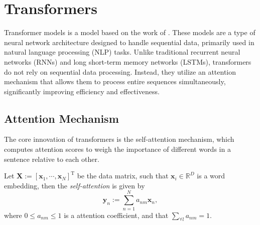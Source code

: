\section{Transformers}\label{sec:transformers}
Transformer models is a model based on the work of \cite{vaswani2017attention}. These models are a type of neural network architecture designed to handle sequential data, primarily used in natural language processing (NLP) tasks. Unlike traditional recurrent neural networks (RNNs) and long short-term memory networks (LSTMs), transformers do not rely on sequential data processing. Instead, they utilize an attention mechanism that allows them to process entire sequences simultaneously, significantly improving efficiency and effectiveness.

\subsection{Attention Mechanism}
The core innovation of transformers is the self-attention mechanism, which computes attention scores to weigh the importance of different words in a sentence relative to each other. 

\begin{defn}\label{defn:vec-self-attention}
    Let $\mathbf{X}:=[\mathbf{x}_1,\cdots,\mathbf{x}_N]^{\text{T}}$ be the data matrix, such that $\mathbf{x}_i\in\mathbb{R}^{D}$ is a word embedding, then the \textit{self-attention} is given by
    \begin{equation}\label{eq:self-attention}
        \mathbf{y}_n := \sum_{n=1}^{N}a_{nm}\mathbf{x}_n,
    \end{equation}
    where $0\leq a_{nm}\leq 1$ is a attention coefficient, and that $\sum_{\forall l}a_{nm}=1$.
\end{defn}

